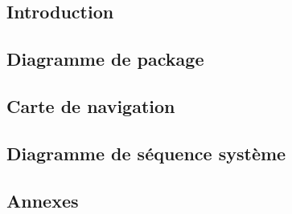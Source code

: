 \documentclass[asi]{picInsa}
\title{\DCD{}}
\author{\Florian{}, \Kafui{}, \Melissa{}, \Julie{}, \Mathieu{}, \Michel{}} %
\begin{document}
\couverture{}

 \informationsGenerales{}


\tableofcontents

\setcounter{chapter}{0}


\chapter*{Introduction}
\label{intro}


\chapter{Diagramme de package}
\label{diagrammeDePackage}


\chapter{Carte de navigation}
\label{diagrammeNavigation}


\chapter{Diagramme de séquence système}
\label{diagrammeSequenceSystem}


\begin{appendix}
\part*{Annexes}
\listoffigures
{}
	 
\listoftables
{}
\end{appendix}
\pageQuatriemeCouverture
\end{document}
